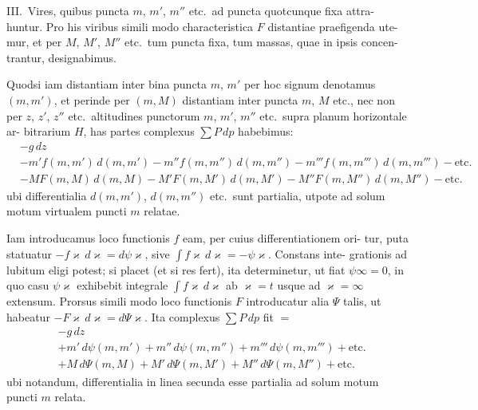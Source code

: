 \documentclass[12pt,a4paper]{article}
\theoremstyle{gauss}
\begin{document}
III.~Vires, quibus puncta $m$, $m'$, $m''$ etc.~ad puncta quotcunque fixa attra-
huntur. Pro his viribus simili modo characteristica $F$ distantiae praefigenda ute-
mur, et per $M$, $M'$, $M''$ etc.~tum puncta fixa, tum massas, quae in ipsis concen-
trantur, designabimus.

Quodsi iam distantiam inter bina puncta $m$, $m'$ per hoc signum denotamus
$(m,m')$, et perinde per $(m,M)$ distantiam inter puncta $m$, $M$ etc., nec non per
$z$, $z'$, $z''$ etc.~altitudines punctorum $m$, $m'$, $m''$ etc.~supra planum horizontale ar-
bitrarium $H$, has partes complexus $\sum P\,dp$ habebimus:
\begin{align*}
&-g\,dz \\
&- m'f(m,m')\,d(m,m') - m''f(m,m'')\,d(m,m'') - m'''f(m,m''')\,d(m,m''') - \text{etc.} \\
&- MF(m,M)\,d(m,M) - M'F(m,M')\,d(m,M') - M''F(m,M'')\,d(m,M'') - \text{etc.}
\end{align*}
ubi differentialia $d(m,m')$, $d(m,m'')$ etc.~sunt partialia, utpote ad solum motum
virtualem puncti $m$ relatae.

Iam introducamus loco functionis $f$ eam, per cuius differentiationem ori-
tur, puta statuatur $-f\varkappa\,d\varkappa = d\psi\varkappa$, sive $\int f\varkappa\,d\varkappa = -\psi\varkappa$. Constans inte-
grationis ad lubitum eligi potest; si placet (et si res fert), ita determinetur, ut fiat
$\psi\infty = 0$, in quo casu $\psi\varkappa$ exhibebit integrale $\int f\varkappa\,d\varkappa$ ab $\varkappa = t$ usque ad
$\varkappa = \infty$ extensum. Prorsus simili modo loco functionis $F$ introducatur alia $\Psi$
talis, ut habeatur $-F\varkappa\,d\varkappa = d\Psi\varkappa$. Ita complexus $\sum P\,dp$ fit $=$
\begin{align*}
&-g\,dz \\
&+ m'\,d\psi(m,m') + m''\,d\psi(m,m'') + m'''\,d\psi(m,m''') + \text{etc.} \\
&+ M\,d\Psi(m,M) + M'\,d\Psi(m,M') + M''\,d\Psi(m,M'') + \text{etc.}
\end{align*}
ubi notandum, differentialia in linea secunda esse partialia ad solum motum
puncti $m$ relata.
\end{document}

